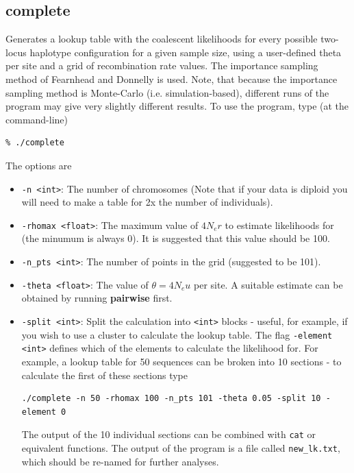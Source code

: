 \documentclass[a4paper,10pt,fullpage]{article}
\begin{document}
\subsection{complete}
Generates a lookup table with the coalescent likelihoods for every
possible two-locus haplotype configuration for a given sample
size, using a user-defined theta per site and a grid of
recombination rate values.  The importance sampling method of
Fearnhead and Donnelly \cite{FearnheadDonnelly01} is used.  Note,
that because the importance sampling method is Monte-Carlo (i.e.
simulation-based), different runs of the program may give very
slightly different results.  To use the program, type (at the command-line)
\begin{verbatim}
% ./complete 
\end{verbatim}
The  options are
\begin{itemize}
\item \verb+-n <int>+: The number of chromosomes (Note that if your data is diploid you will need to make a table for 2x the number of individuals).

\item \verb+-rhomax <float>+: The maximum value of $4N_er$ to estimate likelihoods for (the minumum is always 0).  It is suggested that this value should be 100.

\item \verb+-n_pts <int>+: The number of points in the grid (suggested to be 101).

\item \verb+-theta <float>+: The value of $\theta = 4N_eu$ per site.  A suitable estimate can be obtained by running {\bf pairwise} first.  

\item \verb+-split <int>+: Split the calculation into \verb+<int>+ blocks - useful, for example, if you wish to use a cluster to calculate the lookup table.  The flag \verb+-element <int>+ defines which of the elements to calculate the likelihood for.  For example, a lookup table for 50 sequences can be broken into 10 sections - to calculate the first of these sections type\\
\begin{verbatim}
./complete -n 50 -rhomax 100 -n_pts 101 -theta 0.05 -split 10 -element 0
\end{verbatim}
The output of the 10 individual sections can be combined with \verb+cat+ or equivalent functions. The output of the program is a file called \verb+new_lk.txt+, which should be re-named for further analyses.

\end{itemize}
\end{document}
